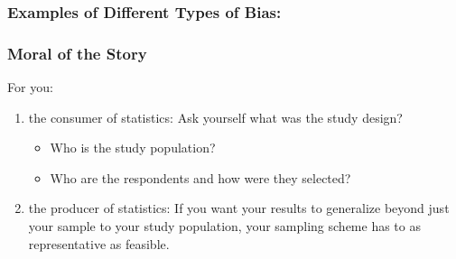 \documentclass[slides]{beamer}
\newcommand{\blue}[1]{\textcolor{blue2}{#1}}
\begin{document}
\begin{frame}
\frametitle{Examples of Different Types of Bias:}

%
%
%

\end{frame}



\begin{frame}
\frametitle{Moral of the Story}
For you:
\begin{enumerate}
\pause \item \blue{the consumer of statistics}: Ask yourself what was the study design?
\begin{itemize}
\item Who is the study population?
\item Who are the respondents and how were they selected?
\end{itemize}
\pause \item \blue{the producer of statistics}:  If you want your results to generalize \blue{beyond} just your sample to your study population, your sampling scheme has to as representative as feasible.
\end{enumerate}

\end{frame}
\end{document}
